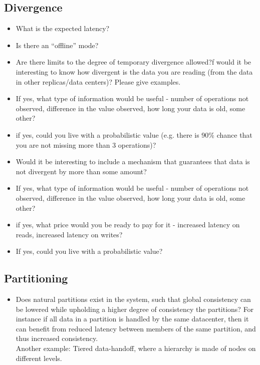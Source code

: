 \documentclass[11pt,a4paper]{report}
\begin{document}
\subsection{Divergence}
\begin{itemize}
\item What is the expected latency? 
\item Is there an ``offline'' mode?
\item Are there limits to the degree of temporary divergence allowed?f
would it be interesting to know how divergent is the data you are reading (from the data in other replicas/data centers)? Please give examples.
\item If yes, what type of information would be useful - number of operations not observed, difference in the value observed, how long your data is old, some other?
\item if yes, could you live with a probabilistic value (e.g. there is 90\% chance that you are not missing more than 3 operations)?

\item Would it be interesting to include a mechanism that guarantees that data is not divergent by more than some amount?
\item If yes, what type of information would be useful - number of operations not observed, difference in the value observed, how long your data is old, some other?
\item if yes, what price would you be ready to pay for it - increased latency on reads, increased latency on writes?
\item If yes, could you live with a probabilistic value?
\end{itemize}

\subsection{Partitioning}
\begin{itemize}
\item Does natural partitions exist in the system, such that global consistency can be lowered while upholding a higher degree of consistency the partitions? For instance if all data in a partition is handled by the same datacenter, then it can benefit from reduced latency between members of the same partition, and thus increased consistency.\\
Another example: Tiered data-handoff, where a hierarchy is made of nodes on different levels.
\end{itemize}
\end{document}
